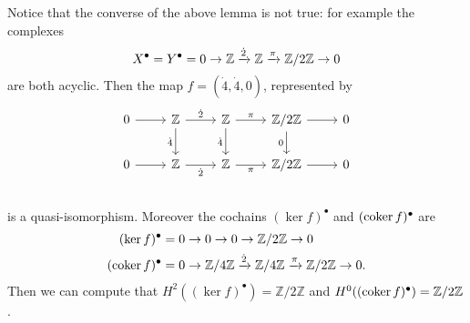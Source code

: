 \begin{rem}[]
	Notice that the converse of the above lemma is not true:
	for example the complexes
	\begin{equation}
	X^\bullet = Y^\bullet = 0 \to \mathbb{Z} \xrightarrow{\dot{2}} 
	\mathbb{Z} \xrightarrow{\pi} \mathbb{Z}/2\mathbb{Z} \to 0
	\end{equation} 
	are both acyclic.
	Then the map $f = (\dot{4}, \dot{4}, 0)$, represented by
	\begin{equation}
	\begin{tikzcd}
		0 \arrow[r, "", rightarrow] &
		\Z \arrow[r, "\dot{2}", rightarrow] \arrow[d, "\dot{4}"', rightarrow] &
		\Z \arrow[r, "\pi", rightarrow] \arrow[d, "\dot{4}"', rightarrow] &
		\mathbb{Z}/2\mathbb{Z} \arrow[r, "", rightarrow] \arrow[d, "0"', rightarrow] &
		0 \\
		0 \arrow[r, "", rightarrow] &
		\Z \arrow[r, "\dot{2}"', rightarrow] &
		\Z \arrow[r, "\pi"', rightarrow] &
		\mathbb{Z}/2\mathbb{Z} \arrow[r, "", rightarrow] &
		0 \\
	\end{tikzcd}
	\end{equation} 
	is a quasi-isomorphism.
	Moreover the cochains $(\ker f)^\bullet$ and $(\operatorname{coker} f)^\bullet$ are
	\begin{align}
		(\ker f)^\bullet &= 0 \to 0 \to 0 \to \mathbb{Z}/2\mathbb{Z} \to 0\\
		(\operatorname{coker} f)^\bullet &= 0 \to \mathbb{Z}/4\mathbb{Z} \xrightarrow{\dot{2}} \mathbb{Z}/4\mathbb{Z}
		\xrightarrow{\pi} \mathbb{Z}/2\mathbb{Z} \to 0
	.\end{align} 
	Then we can compute that $H^2((\ker f)^\bullet) = \mathbb{Z}/2\mathbb{Z}$
	and $H^0((\operatorname{coker} f)^\bullet) = \mathbb{Z}/2\mathbb{Z}$.
\end{rem}
